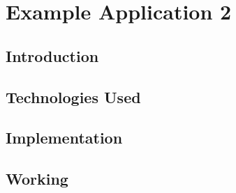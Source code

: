 \chapter{Example Application 2}\label{chapter:poc2}

\section{Introduction}

\section{Technologies Used}

\section{Implementation}

\section{Working}